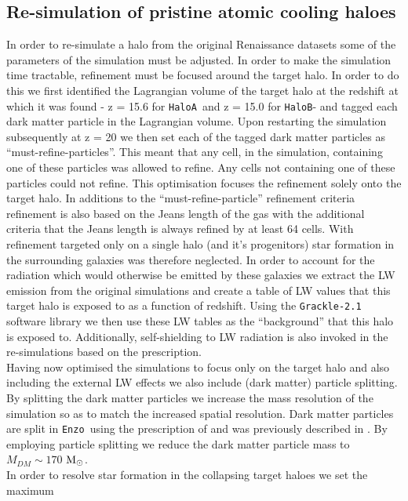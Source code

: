 \documentclass[graphics, twocolumn, usenatbib]{mn2e}
\newcommand{\enzo}{\texttt{Enzo~}}
\newcommand{\grackle}{\texttt{Grackle-2.1~}}
\newcommand{\msolarc} {$\rm{M_{\odot}}$}
\newcommand{\ha} {\texttt{HaloA~}}
\newcommand{\hbc} {\texttt{HaloB}}
\begin{document}
 \subsection{Re-simulation of pristine atomic cooling haloes}
 In order to re-simulate a halo from the original Renaissance datasets some of the parameters of the
 simulation  must be adjusted. In order to make the simulation time tractable, refinement
 must be focused around the target halo. In order to do this we first identified the Lagrangian
 volume of the target halo at the redshift at which it was found - z = 15.6 for \ha and z = 15.0
 for \hbc - and tagged each dark matter particle in the Lagrangian volume. Upon restarting
 the simulation subsequently at z = 20 we then set each of the tagged dark matter particles as
 ``must-refine-particles''. This meant that any cell, in the simulation, containing one of these
 particles was allowed to refine. Any cells not containing one of these particles could not refine.
 This optimisation focuses the refinement solely onto the target halo. In additions to the
 ``must-refine-particle'' refinement criteria refinement is also based on the Jeans length of the
 gas with the additional criteria that the Jeans length is always refined by at least 64 cells. 
 \indent With refinement targeted only on a single halo (and it's progenitors) star formation
 in the surrounding galaxies was therefore neglected. In order to account for the radiation which
 would otherwise be emitted by these galaxies we extract the LW emission from the original
 simulations and create a table of LW values that this target halo is exposed to as a function of
 redshift. Using the \grackle \citep{Grackle} software library we then use these LW tables as
 the ``background'' that this halo is exposed to. Additionally, self-shielding to LW radiation is
 also invoked in the re-simulations based on the \cite{Wolcott-Green_2011} prescription.\\
 \indent Having now optimised the simulations to focus only on the target halo and also including the
 external LW effects we also include (dark matter) particle splitting. By splitting the dark matter
 particles we increase the mass resolution of the simulation so as to match the increased
 spatial resolution. Dark matter particles are split in \enzo using the prescription
 of \cite{Kitsionas_2002} and was previously described in \cite{Regan_2015}. By employing
 particle splitting we reduce the dark matter particle mass to $M_{DM} \sim 170$ \msolarc. \\
 \indent In order to resolve star formation in the collapsing target haloes we set the maximum
\end{document}
